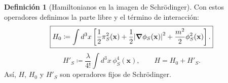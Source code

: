 \documentclass[11pt,letterpaper]{article}
\theoremstyle{definition}
\newtheorem{definicion}{Definición}
\theoremstyle{definition}
\newcommand{\eqbox}[1]{\boxed{\displaystyle #1}}
\begin{document}
\begin{definicion}[Hamiltonianos en la imagen de Schrödinger]
Con estos operadores definimos la parte libre y el término de interacción:
\begin{equation}
  \eqbox{H_0\coloneqq\int d^3x\left[
    \frac{1}{2}\pi_S^2(\mathbf{x})
    +\frac{1}{2}\abs{\grad\phi_S(\mathbf{x})}^2
    +\frac{m^2}{2}\phi_S^2(\mathbf{x})\right].}
  \label{eq:H0Schrodinger}
\end{equation}
\begin{equation}
  \eqbox{H'_S\coloneqq\frac{\lambda}{4!}\int d^3x\,\phi_S^4(\mathbf{x}),
  \qquad H=H_0+H'_S.}
  \label{eq:Hprime}
\end{equation}
Así, $H$, $H_0$ y $H'_S$ son operadores fijos de Schrödinger.
\end{definicion}
\end{document}
